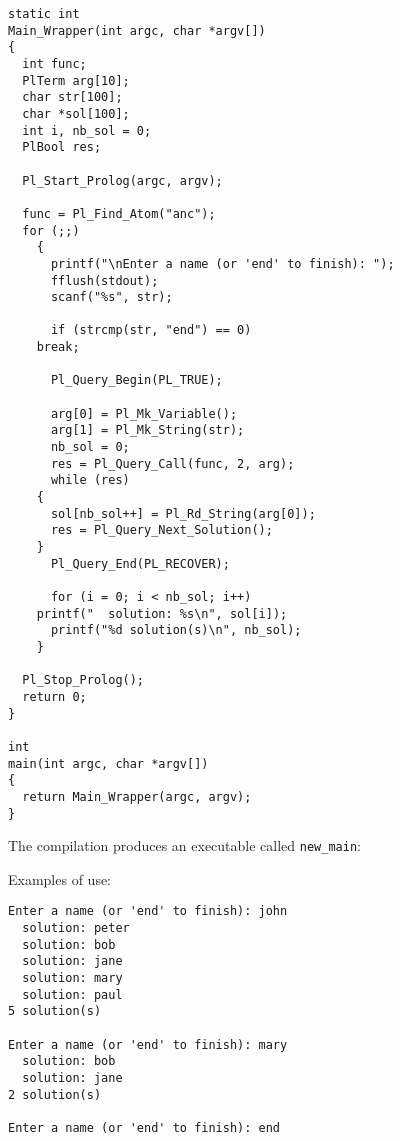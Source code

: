 \begin{Indentation}
\begin{verbatim}
static int
Main_Wrapper(int argc, char *argv[])
{
  int func;
  PlTerm arg[10];
  char str[100];
  char *sol[100];
  int i, nb_sol = 0;
  PlBool res;

  Pl_Start_Prolog(argc, argv);

  func = Pl_Find_Atom("anc");
  for (;;)
    {
      printf("\nEnter a name (or 'end' to finish): ");
      fflush(stdout);
      scanf("%s", str);

      if (strcmp(str, "end") == 0)
	break;

      Pl_Query_Begin(PL_TRUE);

      arg[0] = Pl_Mk_Variable();
      arg[1] = Pl_Mk_String(str);
      nb_sol = 0;
      res = Pl_Query_Call(func, 2, arg);
      while (res)
	{
	  sol[nb_sol++] = Pl_Rd_String(arg[0]);
	  res = Pl_Query_Next_Solution();
	}
      Pl_Query_End(PL_RECOVER);

      for (i = 0; i < nb_sol; i++)
	printf("  solution: %s\n", sol[i]);
      printf("%d solution(s)\n", nb_sol);
    }

  Pl_Stop_Prolog();
  return 0;
}

int
main(int argc, char *argv[])
{
  return Main_Wrapper(argc, argv);
}
\end{verbatim}
\end{Indentation}

The compilation produces an executable called \texttt{new\_main}:


Examples of use:

\begin{Indentation}
\begin{verbatim}
Enter a name (or 'end' to finish): john
  solution: peter
  solution: bob
  solution: jane
  solution: mary
  solution: paul
5 solution(s)

Enter a name (or 'end' to finish): mary
  solution: bob
  solution: jane
2 solution(s)

Enter a name (or 'end' to finish): end
\end{verbatim}
\end{Indentation}

